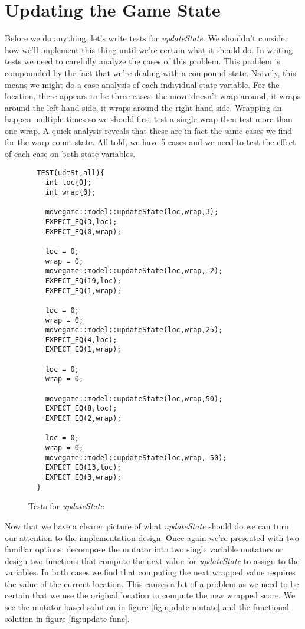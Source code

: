 \documentclass[nobib]{tufte-handout}
\begin{document}
\section{Updating the Game State}

Before we do anything, let's write tests for \textit{updateState}. We shouldn't consider how we'll implement this thing until we're certain what it should do. In writing tests we need to carefully analyze the cases of this problem. This problem is compounded by the fact that we're dealing with a compound state. Naively, this means we might do a case analysis of each individual state variable. For the location, there appears to be three cases: the move doesn't wrap around, it wraps around the left hand side, it wraps around the right hand side. Wrapping an happen multiple times so we should first test a single wrap then test more than one wrap. A quick analysis reveals that these are in fact the same cases we find for the warp count state. All told, we have 5 cases and we need to test the effect of each case on both state variables.

\begin{figure}[!htbp]
\begin{lstlisting}
  TEST(udtSt,all){
    int loc{0};
    int wrap{0};

    movegame::model::updateState(loc,wrap,3);
    EXPECT_EQ(3,loc);
    EXPECT_EQ(0,wrap);

    loc = 0;
    wrap = 0;
    movegame::model::updateState(loc,wrap,-2);
    EXPECT_EQ(19,loc);
    EXPECT_EQ(1,wrap);

    loc = 0;
    wrap = 0;
    movegame::model::updateState(loc,wrap,25);
    EXPECT_EQ(4,loc);
    EXPECT_EQ(1,wrap);

    loc = 0;
    wrap = 0;

    movegame::model::updateState(loc,wrap,50);
    EXPECT_EQ(8,loc);
    EXPECT_EQ(2,wrap);    

    loc = 0;
    wrap = 0;
    movegame::model::updateState(loc,wrap,-50);
    EXPECT_EQ(13,loc);
    EXPECT_EQ(3,wrap);    
  }
\end{lstlisting}
\caption{Tests for \textit{updateState}}
\label{fig:update-tests}
\end{figure}

Now that we have a clearer picture of what \textit{updateState} should do we can turn our attention to the implementation design. Once again we're presented with two familiar options: decompose the mutator into two single variable mutators or design two functions that compute the next value for \textit{updateState} to assign to the variables. In both cases we find that computing the next wrapped value requires the value of the current location. This causes a bit of a problem as we need to be certain that we use the original location to compute the new wrapped score. We see the mutator based solution in figure \ref{fig:update-mutate} and the functional solution in figure \ref{fig:update-func}.
\end{document}
